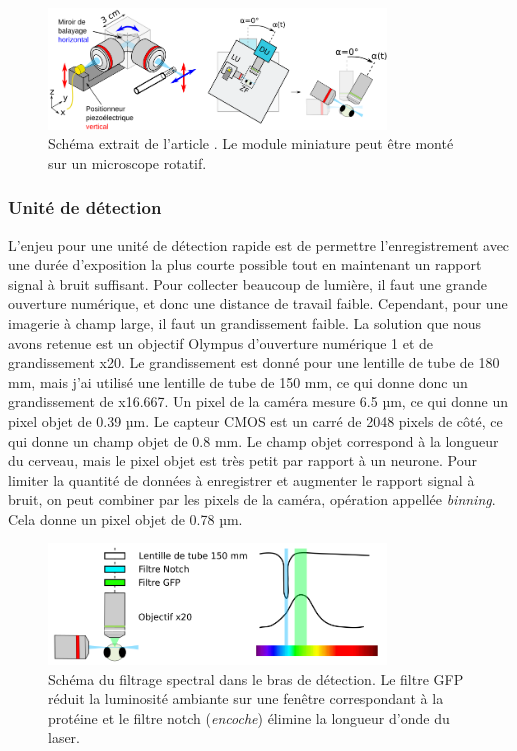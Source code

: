 \begin{figure}
\centering
\includegraphics[width=0.8\textwidth]{./files/miniature_light-sheet.svg.png}
\caption{Schéma extrait de l'article \cite{migault_whole-brain_2018}. Le module miniature peut être monté sur un microscope rotatif.
}
\end{figure}

\subsubsection{Unité de détection}

L'enjeu pour une unité de détection rapide est de permettre l'enregistrement avec une durée d'exposition la plus courte possible tout en maintenant un rapport signal à bruit suffisant. Pour collecter beaucoup de lumière, il faut une grande ouverture numérique, et donc une distance de travail faible. Cependant, pour une imagerie à champ large, il faut un grandissement faible. La solution que nous avons retenue est un objectif Olympus d'ouverture numérique 1 et de grandissement x20. Le grandissement est donné pour une lentille de tube de 180 mm, mais j'ai utilisé une lentille de tube de 150 mm, ce qui donne donc un grandissement de x16.667. Un pixel de la caméra mesure 6.5 µm, ce qui donne un pixel objet de 0.39 µm. Le capteur CMOS est un carré de 2048 pixels de côté, ce qui donne un champ objet de 0.8 mm. Le champ objet correspond à la longueur du cerveau, mais le pixel objet est très petit par rapport à un neurone. Pour limiter la quantité de données à enregistrer et augmenter le rapport signal à bruit, on peut combiner par les pixels de la caméra, opération appellée \emph{binning}. Cela donne un pixel objet de 0.78 µm.

\begin{figure}
\centering
\includegraphics[width=0.8\textwidth]{./files/detection_unit.svg.png}
\caption{Schéma du filtrage spectral dans le bras de détection. Le filtre GFP réduit la luminosité ambiante sur une fenêtre correspondant à la protéine et le filtre notch (\emph{encoche}) élimine la longueur d'onde du laser.}
\end{figure}

